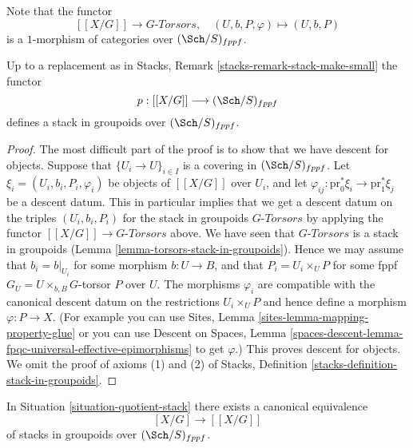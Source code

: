 \medskip\noindent
Note that the functor
$$
[[X/G]] \longrightarrow G\textit{-Torsors},
\quad
(U, b, P, \varphi) \longmapsto (U, b, P)
$$
is a $1$-morphism of categories over $(\Sch/S)_{fppf}$.

\begin{lemma}
\label{lemma-group-quotient-stack-in-groupoids}
Up to a replacement as in
Stacks, Remark \ref{stacks-remark-stack-make-small}
the functor
$$
p : [[X/G]] \longrightarrow (\Sch/S)_{fppf}
$$
defines a stack in groupoids over $(\Sch/S)_{fppf}$.
\end{lemma}

\begin{proof}
The most difficult part of the proof is to show that we have descent for
objects. Suppose that $\{U_i \to U\}_{i \in I}$ is a covering in
$(\Sch/S)_{fppf}$. Let
$\xi_i = (U_i, b_i, P_i, \varphi_i)$ be objects of $[[X/G]]$ over $U_i$,
and let $\varphi_{ij} : \text{pr}_0^*\xi_i \to \text{pr}_1^*\xi_j$
be a descent datum. This in particular implies that we get a descent
datum on the triples $(U_i, b_i, P_i)$ for the stack in groupoids
$G\textit{-Torsors}$ by applying the functor
$[[X/G]] \to G\textit{-Torsors}$ above. We have seen that
$G\textit{-Torsors}$ is a stack in groupoids
(Lemma \ref{lemma-torsors-stack-in-groupoids}).
Hence we may assume that $b_i = b|_{U_i}$ for some morphism $b : U \to B$, and
that $P_i = U_i \times_U P$ for some fppf $G_U = U \times_{b, B} G$-torsor
$P$ over $U$. The morphisms $\varphi_i$ are compatible
with the canonical descent datum on the restrictions $U_i \times_U P$
and hence define a morphism $\varphi : P \to X$. (For example you
can use
Sites, Lemma \ref{sites-lemma-mapping-property-glue}
or you can use
Descent on Spaces,
Lemma \ref{spaces-descent-lemma-fpqc-universal-effective-epimorphisms}
to get $\varphi$.)
This proves descent for objects.
We omit the proof of axioms (1) and (2) of
Stacks, Definition \ref{stacks-definition-stack-in-groupoids}.
\end{proof}

\begin{proposition}
\label{proposition-equal-quotient-stacks}
In
Situation \ref{situation-quotient-stack}
there exists a canonical equivalence
$$
[X/G] \longrightarrow [[X/G]]
$$
of stacks in groupoids over $(\Sch/S)_{fppf}$.
\end{proposition}


